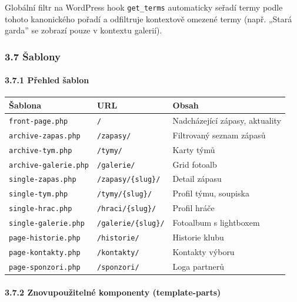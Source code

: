 Globální filtr na WordPress hook \texttt{get\_terms} automaticky seřadí
termy podle tohoto kanonického pořadí a odfiltruje kontextově omezené
termy (např. „Stará garda'' se zobrazí pouze v kontextu galerií).

\subsubsection{3.7 Šablony}\label{ux161ablony}

\paragraph{3.7.1 Přehled šablon}\label{pux159ehled-ux161ablon}

{\def\LTcaptype{none} %
\begin{longtable}[]{@{}lll@{}}
\toprule\noalign{}
Šablona & URL & Obsah \\
\midrule\noalign{}
\endhead
\bottomrule\noalign{}
\endlastfoot
\texttt{front-page.php} & \texttt{/} & Nadcházející zápasy, aktuality \\
\texttt{archive-zapas.php} & \texttt{/zapasy/} & Filtrovaný seznam
zápasů \\
\texttt{archive-tym.php} & \texttt{/tymy/} & Karty týmů \\
\texttt{archive-galerie.php} & \texttt{/galerie/} & Grid fotoalb \\
\texttt{single-zapas.php} & \texttt{/zapasy/\{slug\}/} & Detail
zápasu \\
\texttt{single-tym.php} & \texttt{/tymy/\{slug\}/} & Profil týmu,
soupiska \\
\texttt{single-hrac.php} & \texttt{/hraci/\{slug\}/} & Profil hráče \\
\texttt{single-galerie.php} & \texttt{/galerie/\{slug\}/} & Fotoalbum s
lightboxem \\
\texttt{page-historie.php} & \texttt{/historie/} & Historie klubu \\
\texttt{page-kontakty.php} & \texttt{/kontakty/} & Kontakty výboru \\
\texttt{page-sponzori.php} & \texttt{/sponzori/} & Loga partnerů \\
\end{longtable}
}

\paragraph{3.7.2 Znovupoužitelné komponenty
(template-parts)}\label{znovupouux17eitelnuxe9-komponenty-template-parts}

